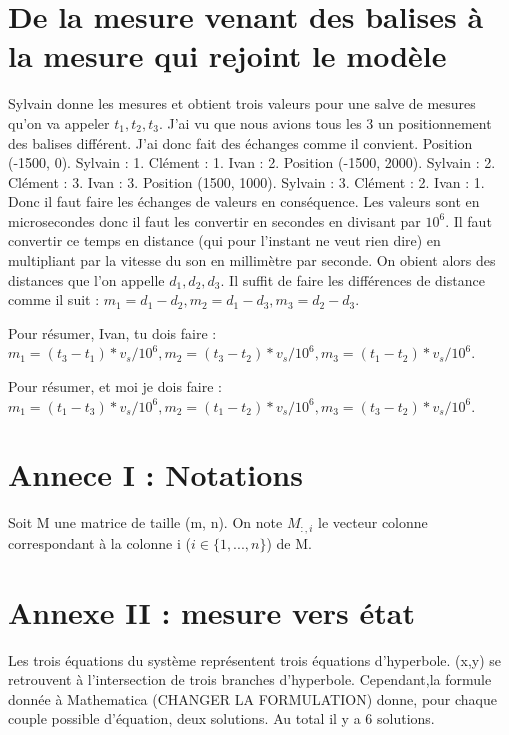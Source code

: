 \documentclass[a4paper, 8pt]{article}
\begin{document}
\section{De la mesure venant des balises à la mesure qui rejoint le modèle}

Sylvain donne les mesures et obtient trois valeurs pour une salve de mesures qu'on va appeler $t_1, t_2, t_3$. J'ai vu que nous avions tous les 3 un positionnement des balises différent. J'ai donc fait des échanges comme il convient.
Position (-1500, 0). Sylvain : 1. Clément : 1. Ivan : 2.
Position (-1500, 2000). Sylvain : 2. Clément : 3. Ivan : 3.
Position (1500, 1000). Sylvain : 3. Clément : 2. Ivan : 1.
Donc il faut faire les échanges de valeurs en conséquence. Les valeurs sont en microsecondes donc il faut les convertir en secondes en divisant par $10^6$. Il faut convertir ce temps en distance (qui pour l'instant ne veut rien dire) en multipliant par la vitesse du son en millimètre par seconde. On obient alors des distances que l'on appelle $d_1, d_2, d_3$. Il suffit de faire les différences de distance comme il suit : $m_1 = d_1 - d_2, m_2 = d_1 - d_3, m_3 = d_2 - d_3$.

Pour résumer, Ivan, tu dois faire : $m_1 = (t_3 - t_1)*v_s/10^6, m_2 = (t_3 - t_2)*v_s/10^6, m_3 = (t_1 - t_2)*v_s/10^6$.

Pour résumer, et moi je dois faire : $m_1 = (t_1 - t_3)*v_s/10^6, m_2 = (t_1 - t_2)*v_s/10^6, m_3 = (t_3 - t_2)*v_s/10^6$.

\section{Annece I : Notations}
Soit M une matrice de taille (m, n). On note $M_{:,i}$ le vecteur colonne correspondant à la colonne i ($i \in \{1,...,n\}$) de M.

\section{Annexe II : mesure vers état}

Les trois équations du système représentent trois équations d'hyperbole. (x,y) se retrouvent à l'intersection de trois branches d'hyperbole. Cependant,la formule donnée à Mathematica (CHANGER LA FORMULATION) donne, pour chaque couple possible d'équation, deux solutions. Au total il y a 6 solutions.
\end{document}
